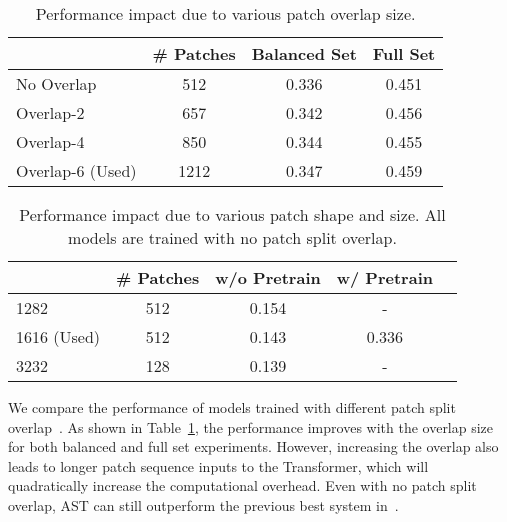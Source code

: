 \documentclass[a4paper]{article}
\newcommand{\squeezeup}{\vspace{-2.0mm}}
\begin{document}
\begin{table}[t]
\footnotesize
\centering
\caption{Performance impact due to various patch overlap size.}
\label{tab:overlap}
\begin{tabular}{@{}lccc@{}}
\toprule
                               & \# Patches & Balanced Set & Full Set \\ \midrule
No Overlap                     &  512            &    0.336  & 0.451              \\
Overlap-2                      &  657            &    0.342  & 0.456              \\
Overlap-4                      &  850            &    0.344  & 0.455           \\
Overlap-6 (Used)               &  1212            &   0.347 &  0.459              \\\bottomrule
\end{tabular}
\end{table}

\begin{table}[!t]
\footnotesize
\centering
\caption{Performance impact due to various patch shape and size. All models are trained with no patch split overlap.}
\label{tab:patchsize}
\begin{tabular}{@{}lcccc@{}}
\toprule
                               & \# Patches   & w/o Pretrain & w/ Pretrain  \\ \midrule
1282                   &  512         & 0.154    &   -           \\
1616 (Used)            &  512         & 0.143       &  0.336            \\ 
3232                   &  128         & 0.139      &   -           \\
\bottomrule
\end{tabular}
\squeezeup
\end{table}

 We compare the performance of models trained with different patch split overlap~\cite{yuan2021tokens}. As shown in Table~\ref{tab:overlap}, the performance improves with the overlap size for both balanced and full set experiments. However, increasing the overlap also leads to longer patch sequence inputs to the Transformer, which will quadratically increase the computational overhead. Even with no patch split overlap, AST can still outperform the previous best system in~\cite{gong2021psla}.
\end{document}
